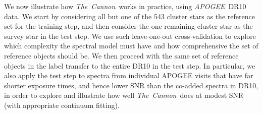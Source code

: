 \documentclass[12pt, preprint]{aastex}
\newcommand{\tc}{\textsl{The~Cannon}}
\newcommand{\apogee}{\textsl{APOGEE}}
\newcommand{\aspcap}{\textsl{ASPCAP}}
\newcommand{\teff}{\mbox{$\rm T_{eff}$}}
\newcommand{\feh}{\mbox{$\rm [Fe/H]$}}
\newcommand{\logg}{\mbox{$\rm \log g$}}
\begin{document}
We now illustrate how \tc\ works in practice, using \apogee\ DR10 data.
We start by considering all but one of the 543 cluster stars as the reference set for the training step, and then consider the one remaining cluster star as the survey star in the test step. We use such leave-one-out cross-validation to explore which complexity the spectral model must have and how comprehensive the set of reference objects should be. We then proceed with the same set of reference objects in the label transfer to the entire DR10 in the test step. In particular, we also apply the test step to spectra from individual APOGEE visits that have far shorter exposure times, and hence lower SNR than the co-added spectra in DR10, in order to explore and illustrate how well \tc\ does at modest SNR (with appropriate continuum fitting).



\end{document}
